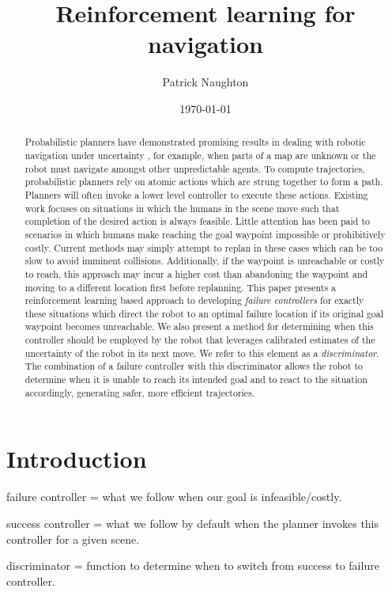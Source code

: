 \documentclass[letterpaper]{IEEEtran}
\title{Reinforcement learning for navigation}
\date{\today}
\author{Patrick Naughton}
\begin{document}
	
	\maketitle
	
	\begin{abstract}
		Probabilistic planners have demonstrated promising results in dealing with robotic navigation under uncertainty \cite{ppcp}, for example, when parts of a map are unknown or the robot must navigate amongst other unpredictable agents. To compute trajectories, probabilistic planners rely on atomic actions which are strung together to form a path. Planners will often invoke a lower level controller to execute these actions. Existing work focuses on situations in which the humans in the scene move such that completion of the desired action is always feasible. Little attention has been paid to scenarios in which humans make reaching the goal waypoint impossible or prohibitively costly. Current methods may simply attempt to replan in these cases which can be too slow to avoid imminent collisions. Additionally, if the waypoint is unreachable or costly to reach, this approach may incur a higher cost than abandoning the waypoint and moving to a different location first before replanning. This paper presents a reinforcement learning based approach to developing \textit{failure controllers} for exactly these situations which direct the robot to an optimal failure location if its original goal waypoint becomes unreachable. We also present a method for determining when this controller should be employed by the robot that leverages calibrated estimates of the uncertainty of the robot in its next move. We refer to this element as a \textit{discriminator}. The combination of a failure controller with this discriminator allows the robot to determine when it is unable to reach its intended goal and to react to the situation accordingly, generating safer, more efficient trajectories.
	\end{abstract}
	
	\section{Introduction}
		failure controller = what we follow when our goal is infeasible/costly.
		
		success controller = what we follow by default when the planner invokes this controller for a given scene.
		
		discriminator = function to determine when to switch from success to failure controller.
\end{document}

